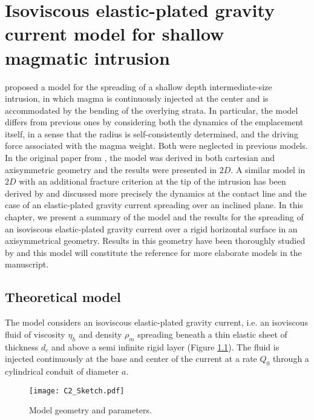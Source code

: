 \chapter{Isoviscous elastic-plated  gravity current model  for shallow
  magmatic intrusion}

\label{chap2} 
\minitoc

\citet{Michaut:2011kg} proposed a model for the spreading of a shallow
depth intermediate-size intrusion, in which magma is continuously
injected  at the  center and  is accommodated  by the  bending of  the
overlying strata.  In particular, the model differs from previous ones
by considering both the dynamics of the emplacement itself, in a sense
that the radius is self-consistently determined, and the driving force
associated with the magma weight. Both were neglected in previous models.
In  the  original paper  from  \citet{Michaut:2011kg},  the model  was
derived in  both cartesian and  axisymmetric geometry and  the results
were presented  in $2D$.  A similar  model in $2D$ with  an additional
fracture criterion  at the tip  of the  intrusion has been  derived by
\citet{Bunger:2011cb}  and  \citet{Anonymous:QWXp_4JV} discussed  more
precisely  the  dynamics at  the  contact  line  and  the case  of  an
elastic-plated gravity  current spreading over an  inclined plane.  In
this chapter,  we present a summary  of the model and  the results for
the spreading of  an isoviscous elastic-plated gravity  current over a
rigid horizontal  surface in  an axisymmetrical geometry.   Results in
this geometry  have been  thoroughly studied  by \citet{Lister:2013ia}
and this model will constitute the reference for more elaborate models
in the manuscript.

\section{Theoretical model}
\label{C2-sec:model}

The model considers an isoviscous elastic-plated gravity current, i.e.
an  isoviscous  fluid  of  viscosity  $\eta_h$  and  density  $\rho_m$
spreading beneath a thin elastic sheet  of thickness $d_c$ and above a
semi infinite rigid layer \citep{Michaut:2011kg,Bunger:2011cb} (Figure
\ref{C2-Sketch}).  The fluid is injected  continuously at the base and
center of the current at a rate $Q_0$ through a cylindrical conduit of
diameter $a$.

\begin{figure}[h!]
  \begin{center}
    \graphicspath{ {/Users/thorey/Documents/These/Manuscript/Figure/Chapter2/} }
    \texttt{[image: C2\_Sketch.pdf]}
    \caption{Model geometry and parameters.}
    \label{C2-Sketch}
  \end{center}
\end{figure}

